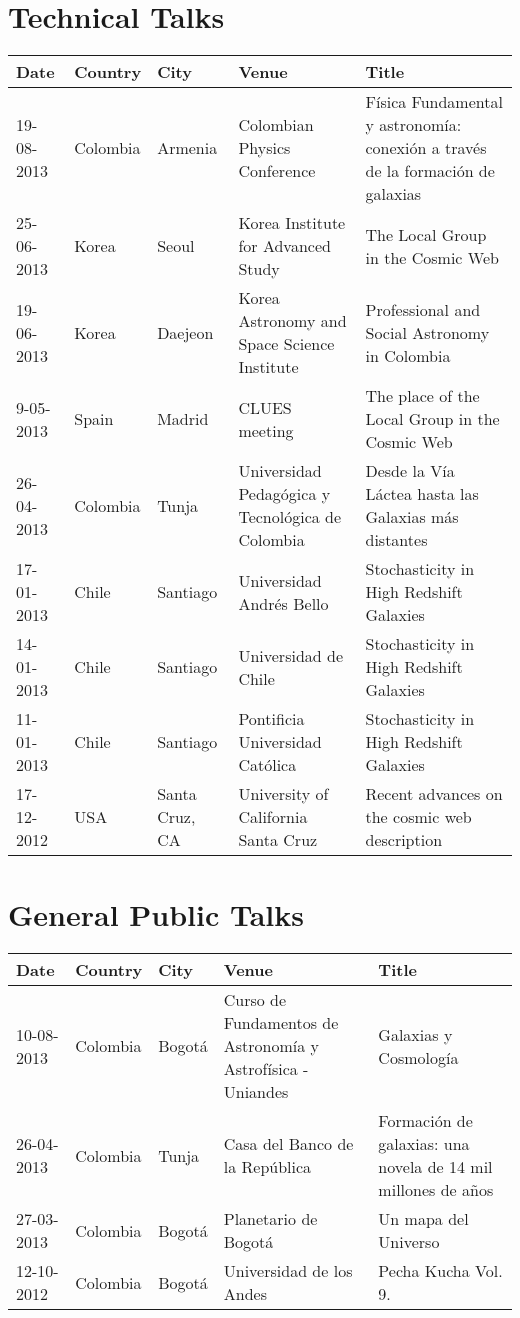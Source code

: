 \documentclass{report}
\begin{document}
\section*{Technical Talks}

\begin{tabular}{p{2.0cm} p{1.5cm} p{1.5cm} p{2cm} p{5cm}}\hline
Date & Country & City& Venue & Title\\\hline
19-08-2013 & Colombia & Armenia & Colombian Physics Conference & F\'isica Fundamental y astronom\'ia: conexi\'on a trav\'es de la formaci\'on de galaxias\\
25-06-2013 & Korea & Seoul & Korea Institute for Advanced Study & The Local Group in the Cosmic Web\\
19-06-2013 & Korea & Daejeon & Korea Astronomy and Space Science Institute & Professional and Social Astronomy in Colombia\\
9-05-2013 & Spain & Madrid & CLUES meeting & The place of the Local Group in the Cosmic Web\\
26-04-2013 & Colombia & Tunja & Universidad Pedag\'ogica y
Tecnol\'ogica de Colombia & Desde la V\'ia L\'actea hasta las Galaxias
m\'as distantes\\
17-01-2013 & Chile & Santiago  & Universidad Andr\'es Bello &
Stochasticity in High Redshift Galaxies\\
14-01-2013 & Chile & Santiago  & Universidad de Chile&
Stochasticity in High Redshift Galaxies\\
11-01-2013 & Chile & Santiago  & Pontificia Universidad Cat\'olica&
Stochasticity in High Redshift Galaxies\\
17-12-2012 & USA & Santa Cruz, CA & University of California Santa
Cruz & Recent advances on the cosmic web description  
\end{tabular}


\section*{General Public Talks}


\begin{tabular}{p{2.0cm} p{1.5cm} p{1.5cm} p{2cm} p{5cm}}\hline
Date & Country & City& Venue& Title\\\hline
10-08-2013 & Colombia & Bogot\'a & Curso de Fundamentos de Astronom\'ia y Astrof\'isica - Uniandes &
Galaxias y Cosmolog\'ia\\
26-04-2013 & Colombia & Tunja & Casa del Banco de la Rep\'ublica &
Formaci\'on de galaxias: una novela de 14 mil millones de a\~nos\\  
27-03-2013 & Colombia & Bogot\'a & Planetario de Bogot\'a & Un mapa del
Universo\\
12-10-2012 & Colombia & Bogot\'a & Universidad de los Andes & Pecha
Kucha Vol. 9.
\end{tabular}
\end{document}
